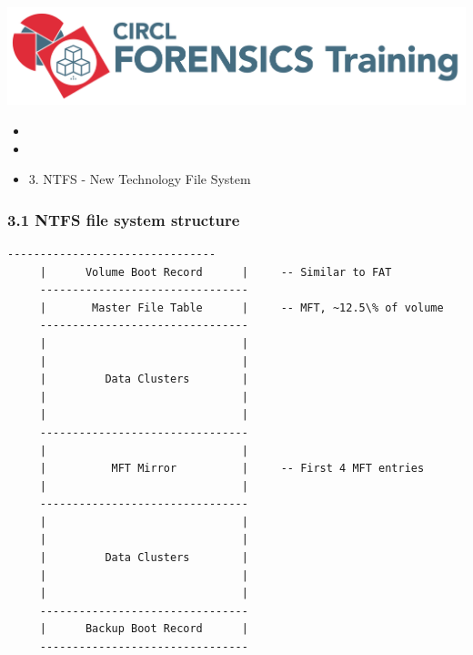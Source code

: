 %
%



\begin{frame}
    \includegraphics[scale=0.3]{images/logo-circl-Forensics.png}
    \begin{itemize}
        \item[]
        \item[]
        \item[] 3. NTFS - New Technology File System
    \end{itemize}
\end{frame}


\begin{frame}[fragile]
  \frametitle{3.1 NTFS file system structure}
  \begin{lstlisting}[basicstyle=\tiny]
     --------------------------------
     |      Volume Boot Record      |     -- Similar to FAT
     --------------------------------
     |       Master File Table      |     -- MFT, ~12.5\% of volume
     --------------------------------
     |                              |
     |                              |
     |         Data Clusters        |
     |                              |
     |                              |
     --------------------------------
     |                              |
     |          MFT Mirror          |     -- First 4 MFT entries
     |                              |
     --------------------------------
     |                              |
     |                              |
     |         Data Clusters        |
     |                              |
     |                              |
     --------------------------------
     |      Backup Boot Record      |
     --------------------------------
  \end{lstlisting}
\end{frame}


